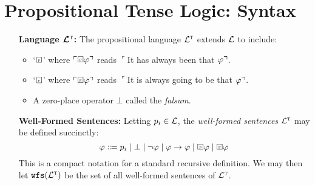 \documentclass[a4paper, 11pt]{article} %
\begin{document}
\section*{\sc Propositional Tense Logic: Syntax}

\begin{enumerate}[leftmargin=1.2in]
  \item[\bf Language $\boldsymbol{\mathcal{L}^{\textsc{t}}}$:] The propositional language $\mathcal{L}^{\textsc{t}}$ extends $\mathcal{L}$ to include:
    \begin{itemize}
      \item `$\Past$' where $\corner{\Past\metaA}$ reads $\ulcorner$It has always been that $\varphi\urcorner$.
      \item `$\Future$' where $\corner{\Future\metaA}$ reads $\ulcorner$It is always going to be that $\varphi\urcorner$.
      \item A zero-place operator $\bot$ called the \textit{falsum}.
    \end{itemize}
	\item[\bf Well-Formed Sentences:] Letting $p_i \in \mathcal{L}$, the \textit{well-formed sentences} $\mathcal{L}^{\textsc{t}}$ may be defined succinctly:
    \[ \metaA \Coloneq p_i \mid 
      \bot \mid 
      \neg\metaA \mid 
      \metaA \rightarrow \metaA \mid 
      \Past\metaA \mid 
      \Future\metaA
    \]
    This is a compact notation for a standard recursive definition.
    We may then let $\texttt{wfs}(\mathcal{L}^{\textsc{t}})$ be the set of all well-formed sentences of $\mathcal{L}^{\textsc{t}}$. 

\end{enumerate}
\end{document}
